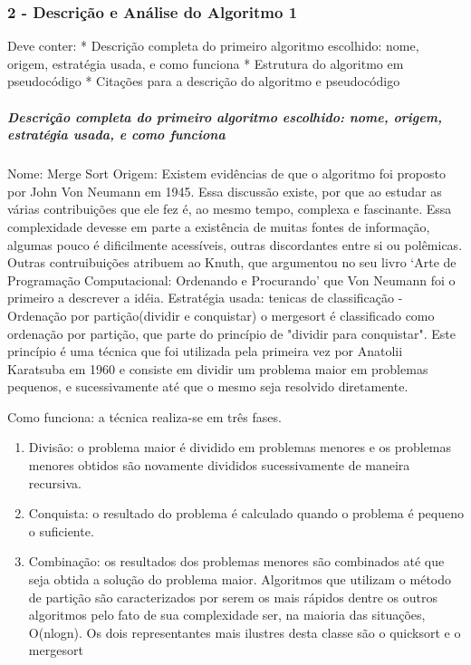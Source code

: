 \documentclass[11pt]{article}
\begin{document}
    \subsubsection{2 - Descrição e Análise do Algoritmo
1}\label{descriuxe7uxe3o-e-anuxe1lise-do-algoritmo-1}

Deve conter: * Descrição completa do primeiro algoritmo escolhido: nome,
origem, estratégia usada, e como funciona * Estrutura do algoritmo em
pseudocódigo * Citações para a descrição do algoritmo e pseudocódigo

    \subparagraph{Descrição completa do primeiro algoritmo escolhido: nome,
origem, estratégia usada, e como
funciona}\label{descriuxe7uxe3o-completa-do-primeiro-algoritmo-escolhido-nome-origem-estratuxe9gia-usada-e-como-funciona}

 Nome: Merge Sort Origem: Existem evidências de que o algoritmo foi
proposto por John Von Neumann em 1945. Essa discussão existe, por que ao
estudar as várias contribuições que ele fez é, ao mesmo tempo, complexa
e fascinante. Essa complexidade devesse em parte a existência de muitas
fontes de informação, algumas pouco é dificilmente acessíveis, outras
discordantes entre si ou polêmicas. Outras contruibuições atribuem ao
Knuth, que argumentou no seu livro `Arte de Programação Computacional:
Ordenando e Procurando' que Von Neumann foi o primeiro a descrever a
idéia. Estratégia usada: tenicas de classificação - Ordenação por
partição(dividir e conquistar) o mergesort é classificado como ordenação
por partição, que parte do princípio de "dividir para conquistar". Este
princípio é uma técnica que foi utilizada pela primeira vez por Anatolii
Karatsuba em 1960 e consiste em dividir um problema maior em problemas
pequenos, e sucessivamente até que o mesmo seja resolvido diretamente.

 Como funciona: a técnica realiza-se em três fases.

\begin{enumerate}
\def\labelenumi{\arabic{enumi})}
\item
  Divisão: o problema maior é dividido em problemas menores e os
  problemas menores obtidos são novamente divididos sucessivamente de
  maneira recursiva.
\item
  Conquista: o resultado do problema é calculado quando o problema é
  pequeno o suficiente.
\item
  Combinação: os resultados dos problemas menores são combinados até que
  seja obtida a solução do problema maior. Algoritmos que utilizam o
  método de partição são caracterizados por serem os mais rápidos dentre
  os outros algoritmos pelo fato de sua complexidade ser, na maioria das
  situações, O(nlogn). Os dois representantes mais ilustres desta classe
  são o quicksort e o mergesort
\end{enumerate}
\end{document}
